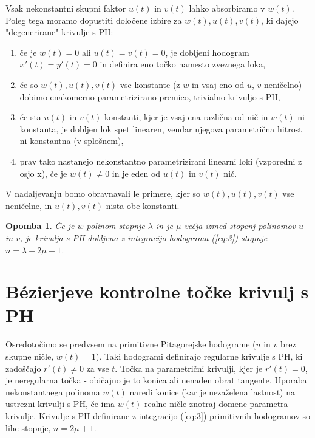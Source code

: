 \documentclass[a4paper]{article}
\newtheorem{remark}{Opomba}
\begin{document}
	Vsak nekonstantni skupni faktor $u (t)$ in $v (t)$ lahko absorbiramo v $w (t)$. Poleg tega moramo dopustiti določene izbire za $w (t), u (t), v (t)$, ki dajejo "degenerirane" krivulje s PH:
	\begin{enumerate}
		\item če je $w (t) = 0$ ali $u (t) = v (t) = 0$, je dobljeni hodogram $x\prime (t) = y\prime (t) = 0$ in definira eno točko namesto zveznega loka,
		\item če so $w (t), u (t), v (t)$ vse konstante (z $w$ in vsaj eno od $u$, $v$ neničelno) dobimo enakomerno parametrizirano premico, trivialno krivuljo s PH,
		\item če sta $u (t)$ in $v (t)$ konstanti, kjer je vsaj ena različna od nič in $w (t)$ ni konstanta, je dobljen lok spet linearen, vendar njegova parametrična hitrost ni konstantna (v splošnem),
		\item prav tako nastanejo nekonstantno parametrizirani linearni loki (vzporedni z osjo x), če je $w (t)\not = 0$ in je eden od $u (t)$ in $v (t)$ nič.
	\end{enumerate}
	V nadaljevanju bomo obravnavali le primere, kjer so $w (t), u (t), v (t)$ vse neničelne,
	in $u (t), v (t)$ nista obe konstanti.
	\begin{remark}
		Če je $w$ polinom stopnje $\lambda$ in je $\mu$ večja izmed stopenj polinomov $u$ in $v$, je krivulja s PH dobljena z integracijo hodograma (\ref{eq:3}) stopnje $n = \lambda + 2\mu+ 1$.
	\end{remark}

	\section{B\'ezierjeve kontrolne točke krivulj s PH}
	Osredotočimo se predvsem na primitivne Pitagorejske hodograme ($u$ in $v$ brez skupne ničle, $w(t)=1$). Taki hodogrami definirajo regularne krivulje s PH, ki zadoščajo $r\prime (t)\not = 0$ za vse $t$. Točka na parametrični krivulji, kjer je $r\prime (t)=0$, je neregularna točka - običajno je to konica ali nenaden obrat tangente. Uporaba nekonstantnega polinoma $w (t)$ naredi konice (kar je nezaželena lastnost) na ustrezni krivulji s PH, če ima $w (t)$ realne ničle znotraj domene parametra krivulje. Krivulje s PH definirane z integracijo (\ref{eq:3}) primitivnih hodogramov so lihe stopnje, $n = 2\mu + 1$.
	
\end{document}
